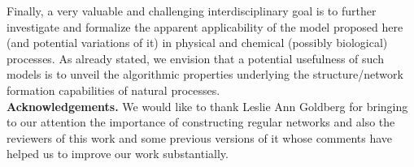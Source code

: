 \documentclass[oribibl, 11pt]{llncs}
\begin{document}
Finally, a very valuable and challenging interdisciplinary goal is to further investigate and formalize the apparent applicability of the model proposed here (and potential variations of it) in physical and chemical (possibly biological) processes. As already stated, we envision that a potential usefulness of such models is to unveil the algorithmic properties underlying the structure/network formation capabilities of natural processes.\\

\noindent \textbf{Acknowledgements.} We would like to thank Leslie Ann Goldberg for bringing to our attention the importance of constructing regular networks and also the reviewers of this work and some previous versions of it whose comments have helped us to improve our work substantially.



\end{document}
